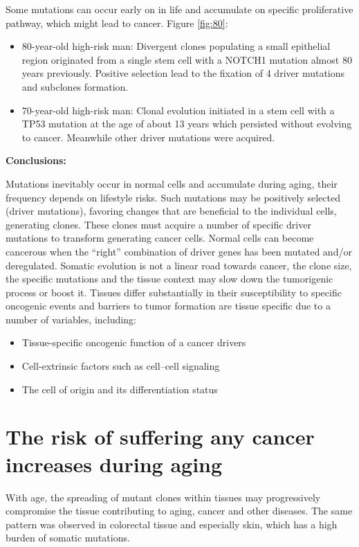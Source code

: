 Some mutations can occur early on in life and accumulate on specific proliferative pathway, which might lead to cancer.
Figure \ref{fig:80}:
\begin{itemize}
\tightlist
\item
80-year-old high-risk man: Divergent clones populating a small epithelial region originated from a single stem cell with a NOTCH1 mutation almost 80 years previously. Positive selection lead to the fixation of 4 driver mutations and subclones formation.
\item
70-year-old high-risk man: Clonal evolution initiated in a stem cell with a TP53 mutation at the age of about 13 years which persisted without evolving to cancer. Meanwhile other driver mutations were acquired.
\end{itemize}

\textbf{Conclusions:}

Mutations inevitably occur in normal cells and accumulate during aging, their frequency depends on lifestyle risks. Such mutations may be positively selected (driver mutations), favoring changes that are beneficial to the individual cells, generating clones. These clones must acquire a number of specific driver mutations to transform generating cancer cells. Normal cells can become cancerous when the ``right'' combination of driver genes has been mutated and/or deregulated. Somatic evolution is not a linear road towards cancer, the clone size, the specific mutations and the tissue context may slow down the tumorigenic process or boost it. Tissues differ substantially in their susceptibility to specific oncogenic events and barriers to tumor formation are tissue specific due to a number of variables, including:

\begin{itemize}
\tightlist
\item
  Tissue-specific oncogenic function of a cancer drivers
\item
  Cell-extrinsic factors such as cell--cell signaling
\item
  The cell of origin and its differentiation status
\end{itemize}

\section{The risk of suffering any cancer increases during aging}

With age, the spreading of mutant clones within tissues may progressively compromise the tissue contributing to aging, cancer and other diseases. The same pattern was observed in colorectal tissue and especially skin, which has a high burden of somatic mutations.

